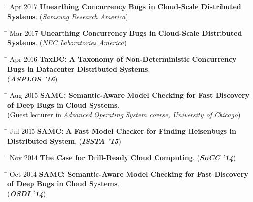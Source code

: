 \documentclass[10pt]{article} %
\begin{document}
\begin{tabbing}
\hspace{2.5cm} \= \kill
Apr 2017 \> \textbf{Unearthing Concurrency Bugs in Cloud-Scale Distributed Systems}. (\textit{Samsung Research America})
\end{tabbing}

\begin{tabbing}
\hspace{2.5cm} \= \kill
Mar 2017 \> \textbf{Unearthing Concurrency Bugs in Cloud-Scale Distributed Systems}. (\textit{NEC Laboratories America})
\end{tabbing}

\begin{tabbing}
\hspace{2.5cm} \= \kill
Apr 2016 \> \textbf{TaxDC: A Taxonomy of Non-Deterministic Concurrency Bugs in Datacenter Distributed Systems}. \\
\> (\textbf{\textit{ASPLOS '16}})
\end{tabbing}

\begin{tabbing}
\hspace{2.5cm} \= \kill
Aug 2015 \> \textbf{SAMC: Semantic-Aware Model Checking for Fast Discovery of Deep Bugs in Cloud Systems}. \\
\> (Guest lecturer in \textit{Advanced Operating System course, University of Chicago})
\end{tabbing}

\begin{tabbing}
\hspace{2.5cm} \= \kill
Jul 2015 \> \textbf{SAMC: A Fast Model Checker for Finding Heisenbugs in Distributed System}. (\textbf{\textit{ISSTA '15}})
\end{tabbing}

\begin{tabbing}
\hspace{2.5cm} \= \kill
Nov 2014 \> \textbf{The Case for Drill-Ready Cloud Computing}. (\textbf{\textit{SoCC '14}})
\end{tabbing}

\begin{tabbing}
\hspace{2.5cm} \= \kill
Oct 2014 \> \textbf{SAMC: Semantic-Aware Model Checking for Fast Discovery of Deep Bugs in Cloud Systems}. \\
\> (\textbf{\textit{OSDI '14}})
\end{tabbing}

\end{document}
